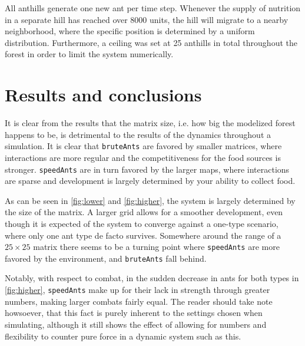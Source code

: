\documentclass[a4paper,12pt]{article}
\theoremstyle{plain}
\theoremstyle{definition}
\begin{document}
      All anthills generate one new ant per time step. Whenever the supply of
      nutrition in a separate hill has reached over 8000 units, the hill will 
      migrate to a nearby neighborhood, where the specific position is determined by a
      uniform distribution. Furthermore, a ceiling was set at 25 anthills in
      total throughout the forest in order to limit the system numerically.

\section{Results and conclusions}
      It is clear from the results that the matrix size, i.e. how big the
      modelized forest happens to be, is detrimental to the results of the
      dynamics throughout a simulation. It is clear that \texttt{bruteAnts} are
      favored by smaller matrices, where interactions are more regular and the
      competitiveness for the food sources is stronger. \texttt{speedAnts} are
      in turn favored by the larger maps, where interactions are sparse and
      development is largely determined by your ability to collect food.

      As can be seen in \cref{fig:lower} and \cref{fig:higher}, the system is
      largely determined by the size of the matrix. A larger grid allows for a
      smoother development, even though it is expected of the system to converge
      against a one-type scenario, where only one ant type de facto survives.
      Somewhere around the range of a $25\times 25$ matrix there seems to be a
      turning point where \texttt{speedAnts} are more favored by the
      environment, and \texttt{bruteAnts} fall behind.

      Notably, with respect to combat, in the sudden decrease in ants for both types in
      \cref{fig:higher}, \texttt{speedAnts} make up for their lack in strength through
      greater numbers, making larger combats fairly equal. The reader should
      take note howsoever, that this fact is purely inherent to the settings
      chosen when simulating, although it still shows the effect of allowing for
      numbers and flexibility to counter pure force in a dynamic system such as
      this.
   
\end{document}

